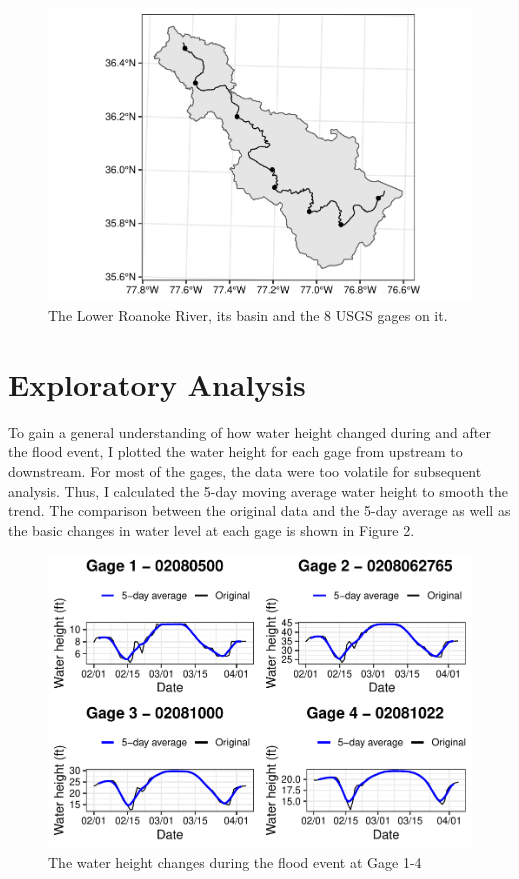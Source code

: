 \documentclass[12pt,]{article}
\begin{document}
\begin{figure}
\centering
\includegraphics{Zeng_WDA_Project_files/figure-latex/Figure 1-1.pdf}
\caption{The Lower Roanoke River, its basin and the 8 USGS gages on it.}
\end{figure}

\newpage

\section{Exploratory Analysis}\label{exploratory-analysis}

To gain a general understanding of how water height changed during and
after the flood event, I plotted the water height for each gage from
upstream to downstream. For most of the gages, the data were too
volatile for subsequent analysis. Thus, I calculated the 5-day moving
average water height to smooth the trend. The comparison between the
original data and the 5-day average as well as the basic changes in
water level at each gage is shown in Figure 2.

\begin{figure}
\centering
\includegraphics{Zeng_WDA_Project_files/figure-latex/Figure 2.1-1.pdf}
\caption{The water height changes during the flood event at Gage 1-4}
\end{figure}
\end{document}
